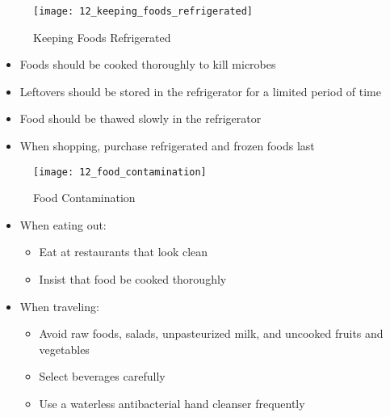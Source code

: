 \documentclass[title={Chapter 12}]{fdsn201notes}
\begin{document}
\begin{figure}[H]
	\centering
	\texttt{[image: 12\_keeping\_foods\_refrigerated]}
	\caption{Keeping Foods Refrigerated}
	\label{fig:keeping-foods-refrigerated}
\end{figure}

\begin{itemize}
	\item Foods should be cooked thoroughly to kill microbes
	\item Leftovers should be stored in the refrigerator for a limited period of time
	\item Food should be thawed slowly in the refrigerator
	\item When shopping, purchase refrigerated and frozen foods last
\end{itemize}

\begin{figure}[H]
	\centering
	\texttt{[image: 12\_food\_contamination]}
	\caption{Food Contamination}
	\label{fig:food-contamination}
\end{figure}

\begin{itemize}
	\item When eating out:
	\begin{itemize}
		\item Eat at restaurants that look clean
		\item Insist that food be cooked thoroughly
	\end{itemize}
	\item When traveling:
	\begin{itemize}
		\item Avoid raw foods, salads, unpasteurized milk, and uncooked fruits and vegetables
		\item Select beverages carefully
		\item Use a waterless antibacterial hand cleanser frequently
	\end{itemize}
\end{itemize}
\end{document}
